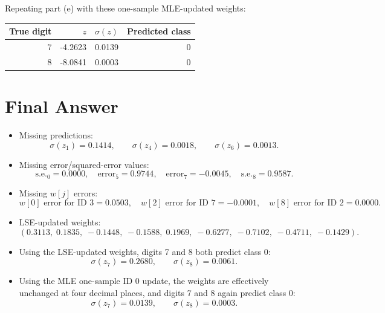 \documentclass[11pt]{article}
\begin{document}
Repeating part (e) with these one-sample MLE-updated weights:

\begin{center}
\begin{tabular}{rrrr}
\toprule
True digit & \(z\) & \(\sigma(z)\) & Predicted class \\
\midrule
7 & -4.2623 & 0.0139 & 0 \\
8 & -8.0841 & 0.0003 & 0 \\
\bottomrule
\end{tabular}
\end{center}

\section*{Final Answer}

\begin{itemize}
    \item Missing predictions:
    \[
        \sigma(z_1)=0.1414,\qquad
        \sigma(z_4)=0.0018,\qquad
        \sigma(z_6)=0.0013.
    \]
    \item Missing error/squared-error values:
    \[
        \text{s.e.}_0=0.0000,\quad
        \text{error}_5=0.9744,\quad
        \text{error}_7=-0.0045,\quad
        \text{s.e.}_8=0.9587.
    \]
    \item Missing \(w[j]\) errors:
    \[
        w[0]\text{ error for ID 3}=0.0503,\quad
        w[2]\text{ error for ID 7}=-0.0001,\quad
        w[8]\text{ error for ID 2}=0.0000.
    \]
    \item LSE-updated weights:
    \[
    (0.3113,\;0.1835,\;-0.1448,\;-0.1588,\;0.1969,\;-0.6277,\;-0.7102,\;-0.4711,\;-0.1429).
    \]
    \item Using the LSE-updated weights, digits 7 and 8 both predict class \(0\):
    \[
        \sigma(z_7)=0.2680,\qquad \sigma(z_8)=0.0061.
    \]
    \item Using the MLE one-sample ID 0 update, the weights are effectively
    unchanged at four decimal places, and digits 7 and 8 again predict class \(0\):
    \[
        \sigma(z_7)=0.0139,\qquad \sigma(z_8)=0.0003.
    \]
\end{itemize}
\end{document}
